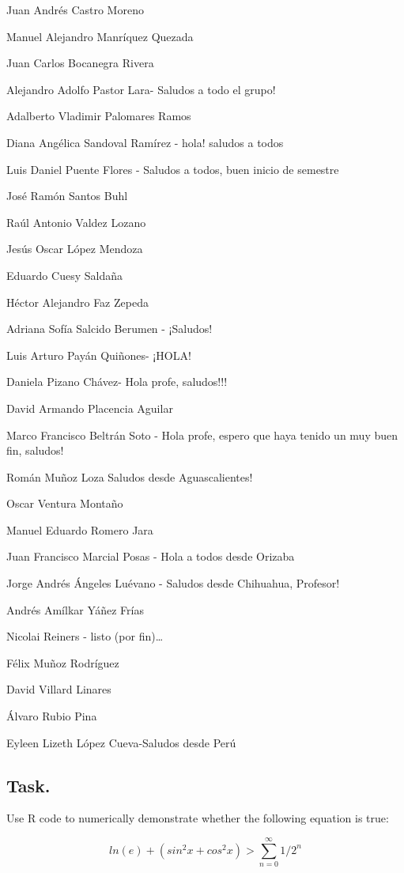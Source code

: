 \documentclass[12pt,halfline,a4paper,]{ouparticle}
\begin{document}
Juan Andrés Castro Moreno

Manuel Alejandro Manríquez Quezada

Juan Carlos Bocanegra Rivera

Alejandro Adolfo Pastor Lara- Saludos a todo el grupo!

Adalberto Vladimir Palomares Ramos

Diana Angélica Sandoval Ramírez - hola! saludos a todos

Luis Daniel Puente Flores - Saludos a todos, buen inicio de semestre

José Ramón Santos Buhl

Raúl Antonio Valdez Lozano

Jesús Oscar López Mendoza

Eduardo Cuesy Saldaña

Héctor Alejandro Faz Zepeda

Adriana Sofía Salcido Berumen - ¡Saludos!

Luis Arturo Payán Quiñones- ¡HOLA!

Daniela Pizano Chávez- Hola profe, saludos!!!

David Armando Placencia Aguilar

Marco Francisco Beltrán Soto - Hola profe, espero que haya tenido un muy
buen fin, saludos!

Román Muñoz Loza Saludos desde Aguascalientes!

Oscar Ventura Montaño

Manuel Eduardo Romero Jara

Juan Francisco Marcial Posas - Hola a todos desde Orizaba

Jorge Andrés Ángeles Luévano - Saludos desde Chihuahua, Profesor!

Andrés Amílkar Yáñez Frías

Nicolai Reiners - listo (por fin)\ldots{}

Félix Muñoz Rodríguez

David Villard Linares

Álvaro Rubio Pina

Eyleen Lizeth López Cueva-Saludos desde Perú

\hypertarget{task.}{%
\subsection{Task.}\label{task.}}

Use R code to numerically demonstrate whether the following equation is
true:

\begin{equation}\label{eq:eq3}
ln(e)+(sin^2x+cos^2x) > \sum^{\infty}_{n=0}1/2^n
\end{equation}
\end{document}
